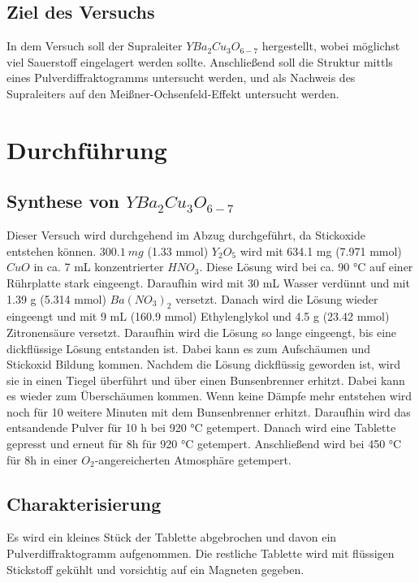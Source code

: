 \documentclass[12pt, a4paper]{article}
\begin{document}
\subsection{Ziel des Versuchs}
{In dem Versuch soll der Supraleiter $YBa_2Cu_3O_{6-7}$ hergestellt, wobei möglichst viel Sauerstoff eingelagert werden sollte. Anschließend soll die Struktur mittls eines Pulverdiffraktogramms untersucht werden, 
und als Nachweis des Supraleiters auf den Meißner-Ochsenfeld-Effekt untersucht werden.\cite{Skript}
}

\newpage
\section{Durchführung}
\subsection{\texorpdfstring{Synthese von $YBa_2Cu_3O_{6-7}$}{Synthese von YBa2Cu3O6-7}}
{

Dieser Versuch wird durchgehend im Abzug durchgeführt, da Stickoxide entstehen können.
$300.1\ mg$ (1.33 mmol) $Y_2O_5$ wird mit 634.1 mg (7.971 mmol) $CuO$ in ca. 7 mL konzentrierter $HNO_3$. Diese Lösung wird bei ca. 90 °C auf einer 
Rührplatte stark eingeengt. Daraufhin wird mit 30 mL Wasser verdünnt und mit 1.39 g (5.314 mmol) $Ba(NO_3)_2$ versetzt. Danach wird die Lösung wieder eingeengt und mit 
9 mL (160.9 mmol) Ethylenglykol und 4.5 g (23.42 mmol) Zitronensäure versetzt. Daraufhin wird die Lösung so lange eingeengt, bis eine dickflüssige Lösung entstanden ist. 
Dabei kann es zum Aufschäumen und Stickoxid Bildung kommen. Nachdem die Lösung dickflüssig geworden ist, wird sie in einen Tiegel überführt und über einen Bunsenbrenner erhitzt. 
Dabei kann es wieder zum Überschäumen kommen. Wenn keine Dämpfe mehr entstehen wird noch für 10 weitere Minuten mit dem Bunsenbrenner erhitzt. Daraufhin wird das entsandende Pulver für 10 h bei 920 °C getempert. 
Danach wird eine Tablette gepresst und erneut für 8h für 920 °C getempert. Anschließend wird bei 450 °C für 8h in einer $O_2$-angereicherten Atmosphäre getempert.\cite{Skript}
}
\subsection{Charakterisierung}
{
Es wird ein kleines Stück der Tablette abgebrochen und davon ein Pulverdiffraktogramm aufgenommen. Die restliche Tablette wird mit flüssigen Stickstoff gekühlt und vorsichtig auf 
ein Magneten gegeben. 




}
\end{document}

